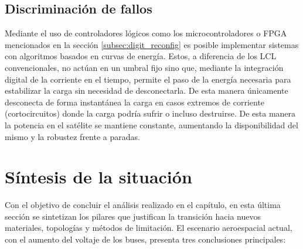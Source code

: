 \documentclass[12pt]{report} %
\begin{document}
\subsection{Discriminación de fallos}
Mediante el uso de controladores lógicos como los microcontroladores o FPGA mencionados en la sección \ref{subsec:digit_reconfig} es posible implementar sistemas con algoritmos basados en curvas de energía. Estos, a diferencia de los LCL convencionales, no actúan en un umbral fijo sino que, mediante la integración digital de la corriente en el tiempo, permite el paso de la energía necesaria para estabilizar la carga sin necesidad de desconectarla. De esta manera únicamente desconecta de forma instantánea la carga en casos extremos de corriente (cortocircuitos) donde la carga podría sufrir o incluso destruirse. De esta manera la potencia en el satélite se mantiene constante, aumentando la disponibilidad del mismo y la robustez frente a paradas\cite{noauthor_comprension_nodate}.

\section{Síntesis de la situación}

Con el objetivo de concluir el análisis realizado en el capítulo, en esta última sección se sintetizan los pilares que justifican la transición hacia nuevos materiales, topologías y métodos de limitación. El escenario aeroespacial actual, con el aumento del voltaje de los buses, presenta tres conclusiones principales:
\end{document}
